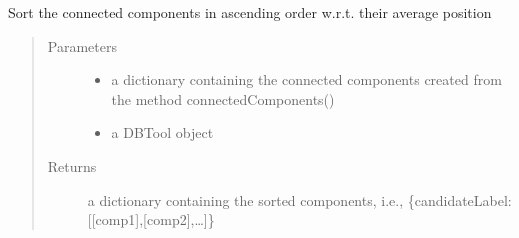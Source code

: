 \documentclass[letterpaper,10pt,english]{sphinxmanual}
\begin{document}

\begin{fulllineitems}
\label{\detokenize{refinement:refinement.labelRefinement.sortConectedComponents}}
Sort the connected components in ascending order w.r.t. their average position
\begin{quote}\begin{description}
\item[{Parameters}] \leavevmode\begin{itemize}
\item {} 
 \textendash{} a dictionary containing the connected components created from the method connectedComponents()

\item {} 
 \textendash{} a DBTool object

\end{itemize}

\item[{Returns}] \leavevmode
a dictionary containing the sorted components, i.e., \{candidateLabel: {[}{[}comp1{]},{[}comp2{]},…{]}\}

\end{description}\end{quote}

\end{fulllineitems}

\end{document}
